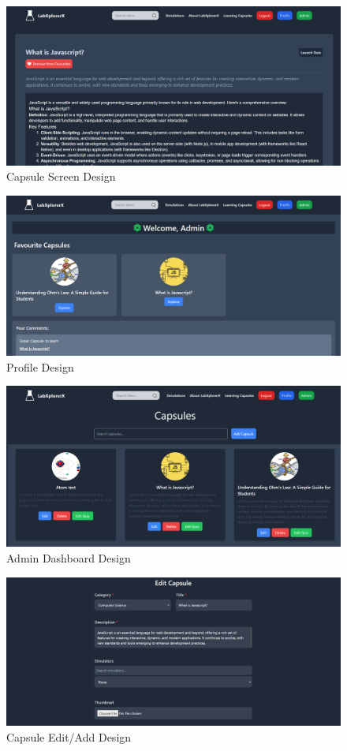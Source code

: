  \begin{figure}[H]
    \centering
     \includegraphics[width = 15cm]{Diagrams/interface/cap.png}
     \caption{Capsule Screen Design}
 \end{figure}
 \begin{figure}[H]
    \centering
     \includegraphics[width = 15cm]{Diagrams/interface/admin.png}
     \caption{Profile Design}
 \end{figure}
 \begin{figure}[H]
    \centering
     \includegraphics[width = 15cm]{Diagrams/interface/admin_dash.png}
     \caption{Admin Dashboard Design}
 \end{figure}
 \begin{figure}[H]
    \centering
     \includegraphics[width = 15cm]{Diagrams/interface/edit.png}
     \caption{Capsule Edit/Add Design}
 \end{figure}
\newpage
